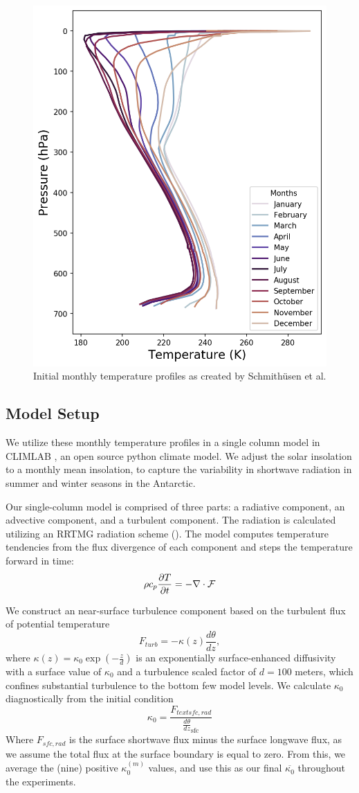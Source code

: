 \documentclass[12]{article}
\begin{document}
\begin{figure}[htb!]
\noindent\includegraphics[width=.5\textwidth]{figures/initial_temperature_profiles.png}
\centering
\caption{Initial monthly temperature profiles as created by Schmithüsen et al.}
\label{fig:temperature_profiles}
\end{figure}

\subsection{Model Setup}
We utilize these monthly temperature profiles in a single column model in CLIMLAB \citep{rose_climlab_2018}, an open source python climate model. We adjust the solar insolation to a monthly mean insolation, to capture the variability in shortwave radiation in summer and winter seasons in the Antarctic. 

Our single-column model is comprised of three parts: a radiative component, an advective component, and a turbulent component. The radiation is calculated utilizing an RRTMG radiation scheme (). The model computes temperature tendencies from the flux divergence of each component and steps the temperature forward in time:
\begin{equation}
    \rho c_{p} \pdv{T}{t} = -\nabla \cdot \mathbf{\mathcal{F}}
\end{equation}

We construct an near-surface turbulence component based on the turbulent flux of potential temperature
\begin{equation}
    F_{turb} = -\kappa(z) \frac{d\theta}{dz},
\end{equation}
where $\kappa(z) = \kappa_0 \exp(-\frac{z}{d})$ is an exponentially surface-enhanced diffusivity with a surface value of $\kappa_0$ and a turbulence scaled factor of $d = 100$ meters, which confines substantial turbulence to the bottom few model levels. We calculate $\kappa_0$ diagnostically from the initial condition
\begin{equation}
    \kappa_0 = \frac{F_{text{sfc, rad}}}{\frac{d\theta}{dz}_{\text{sfc}}}
\end{equation}
Where $F_{sfc, rad}$ is the surface shortwave flux minus the surface longwave flux, as we assume the total flux at the surface boundary is equal to zero. From this, we average the (nine) positive $\kappa_0^{(m)}$ values, and use this as our final $\overline{\kappa_0}$ throughout the experiments.
\end{document}
